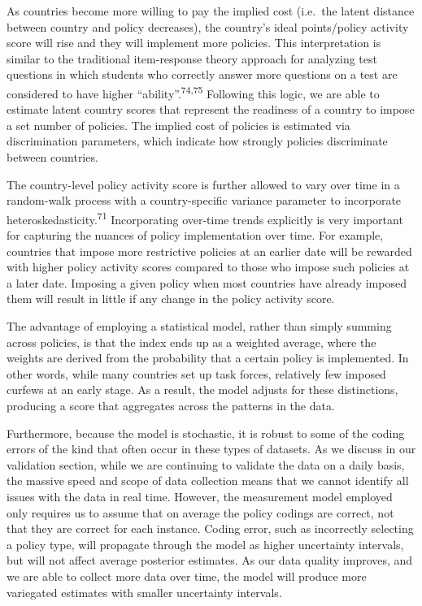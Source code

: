 \documentclass[
]{article}
\begin{document}
As countries become more willing to pay the implied cost (i.e.~the latent distance between country and policy decreases), the country's ideal points/policy activity score will rise and they will implement more policies. This interpretation is similar to the traditional item-response theory approach for analyzing test questions in which students who correctly answer more questions on a test are considered to have higher ``ability''.\textsuperscript{74,75} Following this logic, we are able to estimate latent country scores that represent the readiness of a country to impose a set number of policies. The implied cost of policies is estimated via discrimination parameters, which indicate how strongly policies discriminate between countries.

The country-level policy activity score is further allowed to vary over time in a random-walk process with a country-specific variance parameter to incorporate heteroskedasticity.\textsuperscript{71} Incorporating over-time trends explicitly is very important for capturing the nuances of policy implementation over time. For example, countries that impose more restrictive policies at an earlier date will be rewarded with higher policy activity scores compared to those who impose such policies at a later date. Imposing a given policy when most countries have already imposed them will result in little if any change in the policy activity score.

The advantage of employing a statistical model, rather than simply summing across policies, is that the index ends up as a weighted average, where the weights are derived from the probability that a certain policy is implemented. In other words, while many countries set up task forces, relatively few imposed curfews at an early stage. As a result, the model adjusts for these distinctions, producing a score that aggregates across the patterns in the data.

Furthermore, because the model is stochastic, it is robust to some of the coding errors of the kind that often occur in these types of datasets. As we discuss in our validation section, while we are continuing to validate the data on a daily basis, the massive speed and scope of data collection means that we cannot identify all issues with the data in real time. However, the measurement model employed only requires us to assume that on average the policy codings are correct, not that they are correct for each instance. Coding error, such as incorrectly selecting a policy type, will propagate through the model as higher uncertainty intervals, but will not affect average posterior estimates. As our data quality improves, and we are able to collect more data over time, the model will produce more variegated estimates with smaller uncertainty intervals.
\end{document}
